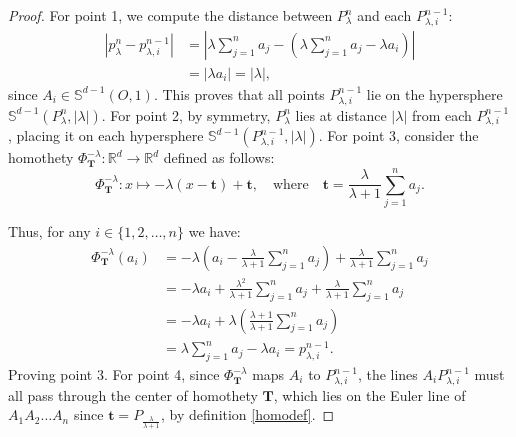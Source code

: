 \documentclass{birkjour}
\theoremstyle{definition}
\theoremstyle{remark}
\numberwithin{equation}{section}
\begin{document}
\begin{proof}
    For point 1, we compute the distance between $P_{\lambda}^n$ and each $P_{\lambda,i}^{n-1}$:
\begin{equation}
    \begin{split}
        |p_{\lambda}^n - p_{\lambda,i}^{n-1}| &= \left| \lambda \sum_{j=1}^{n} a_j - \left( \lambda \sum_{j=1}^{n} a_j - \lambda a_i \right)\right| \\
        &= |\lambda a_i| = |\lambda|,
    \end{split}
\end{equation}
    since $A_i \in \mathbb{S}^{d-1}(O,1)$. This proves that all points $P_{\lambda,i}^{n-1}$ lie on the hypersphere $\mathbb{S}^{d-1}(P_{\lambda}^n, |\lambda|)$. For point 2, by symmetry, $P_{\lambda}^n$ lies at distance $|\lambda|$ from each $P_{\lambda,i}^{n-1}$, placing it on each hypersphere $\mathbb{S}^{d-1}(P_{\lambda,i}^{n-1}, |\lambda|)$. For point 3, consider the homothety $\Phi_{\mathbf{T}}^{-\lambda} : \mathbb{R}^d \to \mathbb{R}^d$ defined as follows:
    \begin{equation}\label{homodef}
        \Phi_{\mathbf{T}}^{-\lambda}: x \mapsto -\lambda(x - \mathbf{t}) + \mathbf{t}, \quad \text{where} \quad \mathbf{t} = \frac{\lambda}{\lambda + 1} \sum_{j=1}^{n} a_j.
    \end{equation}
    
    Thus, for any $i \in \{1,2,\ldots,n\}$ we have: \begin{equation}
        \begin{split}
              \Phi^{-\lambda}_{\mathbf{T}}(a_i) &= -\lambda\left(a_i - \frac{\lambda}{\lambda + 1}\sum_{j=1}^{n}a_j\right) + \frac{\lambda}{\lambda + 1}\sum_{j=1}^{n}a_j \\
        &= -\lambda a_i + \frac{\lambda^2}{\lambda + 1}\sum_{j=1}^{n}a_j + \frac{\lambda}{\lambda + 1}\sum_{j=1}^{n}a_j \\
        &= -\lambda a_i + \lambda\left(\frac{\lambda + 1}{\lambda + 1}\sum_{j=1}^{n}a_j\right) \\
        &= \lambda\sum_{j=1}^{n}a_j - \lambda a_i = p_{\lambda,i}^{n-1}.
        \end{split}
    \end{equation}
     Proving point 3. For point 4, since $\Phi_{\mathbf{T}}^{-\lambda}$ maps $A_i$ to $P_{\lambda,i}^{n-1}$, the lines $A_iP_{\lambda,i}^{n-1}$ must all pass through the center of homothety $\mathbf{T}$, which lies on the Euler line of $A_1A_2\ldots A_n$ since $\mathbf{t}= P_{\frac{\lambda}{\lambda +1}}$, by definition \eqref{homodef}.
\end{proof}
\end{document}
